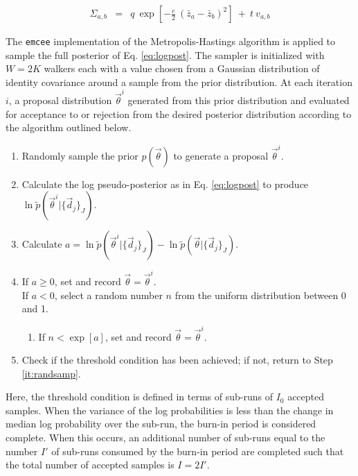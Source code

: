 \documentclass[preprint]{aastex}
\begin{document}
\begin{eqnarray}
\label{eq:priorcov}
\Sigma_{a,b} &=& q\ \exp[-\frac{e}{2}\ (\bar{z}_{a}-\bar{z}_{b})^{2}]\ +\ t\ v_{a,b}
\end{eqnarray}

The \texttt{emcee} implementation of the Metropolis-Hastings algorithm is applied to sample the full posterior of Eq. \ref{eq:logpost}.   \citep{for12}   The sampler is initialized with $W=2K$ walkers each with a value chosen from a Gaussian distribution of identity covariance around a sample from the prior distribution.  At each iteration $i$, a proposal distribution $\vec{\theta}^{i}$ generated from this prior distribution and evaluated for acceptance to or rejection from the desired posterior distribution according to the algorithm outlined below.  

\begin{enumerate}
\item \label{it:randsamp} Randomly sample the prior $p(\vec{\theta})$ to generate a proposal $\vec{\theta}^{i}$.
\item Calculate the log pseudo-posterior as in Eq. \ref{eq:logpost} to produce $\ln\tilde{p}(\vec{\theta}^{i}|\{\vec{d}_{j}\}_{J})$.
\item Calculate $a=\ln\tilde{p}(\vec{\theta}^{i}|\{\vec{d}_{j}\}_{J})-\ln\tilde{p}(\vec{\theta}|\{\vec{d}_{j}\}_{J})$.
\item If $a\geq0$, set and record $\vec{\theta}=\vec{\theta}^{i}$.\\
If $a<0$, select a random number $n$ from the uniform distribution between 0 and 1.
\begin{enumerate}
\item If $n<\exp[a]$, set and record $\vec{\theta}=\vec{\theta}^{i}$.
\end{enumerate}
\item Check if the threshold condition has been achieved; if not, return to Step \ref{it:randsamp}.
\end{enumerate}

Here, the threshold condition is defined in terms of sub-runs of $I_{0}$ accepted samples.  When the variance of the log probabilities is less than the change in median log probability over the sub-run, the burn-in period is considered complete.  When this occurs, an additional number of sub-runs equal to the number $I'$ of sub-runs consumed by the burn-in period are completed such that the total number of accepted samples is $I=2I'$.  
\end{document}
